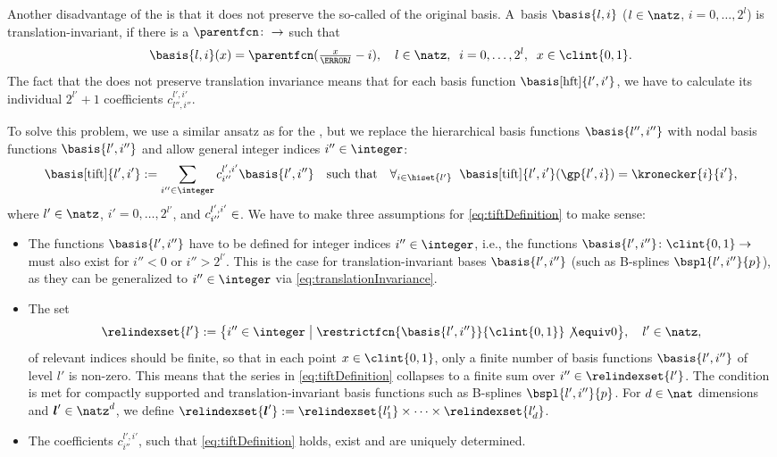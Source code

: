 Another disadvantage of the \hftr is that it does not preserve
the so-called  of the original basis.
A~basis $\basis{l,i}$ ($l \in \natz$, $i = 0, \dotsc, 2^l$)
is translation-invariant, if there is a 
$\parentfcn\colon \real \to \real$
such that
\begin{equation}
  \label{eq:translationInvariance}
  \basis{l,i}(x)
  = \parentfcn(\tfrac{x}{\ms{l}} - i),\quad
  l \in \natz,\;\;
  i = 0, \dotsc, 2^l,\;\;
  x \in \clint{0, 1}.
\end{equation}
The fact that the \hftr does not preserve translation invariance means
that for each basis function $\basis[\hft]{l',i'}$, we have to
calculate its individual $2^{l'} + 1$ coefficients $c_{l'',i''}^{l',i'}$.

To solve this problem,
we use a similar ansatz as for the \hftr,
but we replace the hierarchical basis functions $\basis{l'',i''}$
with nodal basis functions $\basis{l',i''}$ and
allow general integer indices $i'' \in \integer$:
\begin{equation}
  \label{eq:tiftDefinition}
  \basis[\tift]{l',i'}
  := \sum_{i'' \in \integer} c_{i''}^{l',i'} \basis{l',i''}
  \quad\text{such that}\quad
  \falarge{i \in \hiset{l'}}{
    \basis[\tift]{l',i'}(\gp{l',i}) = \kronecker{i}{i'},
  }
\end{equation}
where $l' \in \natz$, $i' = 0, \dotsc, 2^{l'}$, and
$c_{i''}^{l',i'} \in \real$.
We have to make three assumptions for \eqref{eq:tiftDefinition} to make sense:

\begin{itemize}
  \item
  The functions $\basis{l',i''}$ have to be defined for integer indices
  $i'' \in \integer$, i.e.,
  the functions $\basis{l',i''}\colon \clint{0, 1} \to \real$
  must also exist for $i'' < 0$ or $i'' > 2^{l'}$.
  This is the case for translation-invariant bases
  $\basis{l',i''}$ (such as B-splines $\bspl{l',i''}{p}$),
  as they can be generalized to $i'' \in \integer$
  via \cref{eq:translationInvariance}.
  
  \item
  The set
  \begin{equation}
    \relindexset{l'}
    := \braced*{
      i'' \in \integer \bigm\vert
      \restrictfcn{\basis{l',i''}}{\clint{0, 1}} \not\equiv 0
    },\quad
    l' \in \natz,
  \end{equation}
  of relevant indices should be finite,
  so that in each point $x \in \clint{0, 1}$,
  only a finite number of basis functions $\basis{l',i''}$ of level $l'$
  is non-zero.
  This means that the series in \eqref{eq:tiftDefinition} collapses to a
  finite sum over $i'' \in \relindexset{l'}$.
  The condition is met for compactly supported and translation-invariant
  basis functions such as B-splines $\bspl{l',i''}{p}$.
  For $d \in \nat$ dimensions and $\*l' \in \natz^d$, we define
  $\relindexset{\*l'} :=
  \relindexset{l'_1} \times \dotsb \times \relindexset{l'_d}$.
  
  \item
  The coefficients $c_{i''}^{l',i'}$, such that
  \eqref{eq:tiftDefinition} holds, exist and are uniquely determined.
\end{itemize}

